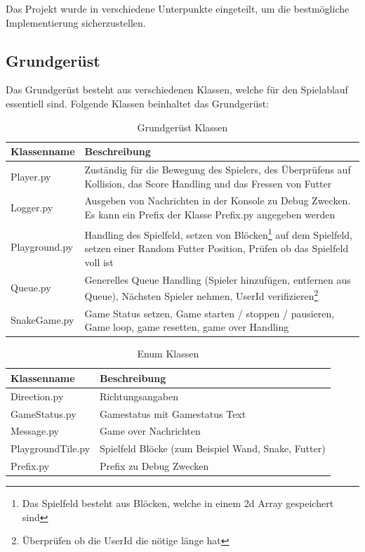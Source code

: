 \documentclass[a4paper,12pt]{scrartcl}
\begin{document}

Das Projekt wurde in verschiedene Unterpunkte eingeteilt, um die bestmögliche Implementierung sicherzustellen.


\subsection{Grundgerüst}
\label{grundgerüst}
Das Grundgerüst besteht aus verschiedenen Klassen, welche für den Spielablauf essentiell sind. Folgende Klassen beinhaltet das Grundgerüst:

\newpage

\begin{table}
\centering
\begin{tabular}[!htb]{p{4cm}|p{10cm}}
Klassenname & Beschreibung \\
\hline
Player.py & Zuständig für die Bewegung des Spielers, des Überprüfens auf Kollision, das Score Handling und das Fressen von Futter \\
Logger.py & Ausgeben von Nachrichten in der Konsole zu Debug Zwecken. Es kann ein Prefix der Klasse Prefix.py angegeben werden \\
Playground.py & Handling des Spielfeld, setzen von Blöcken\footnote{Das Spielfeld besteht aus Blöcken, welche in einem 2d Array gespeichert sind} auf dem Spielfeld, setzen einer Random Futter Position, Prüfen ob das Spielfeld voll ist \\
Queue.py & Generelles Queue Handling (Spieler hinzufügen, entfernen aus Queue), Nächsten Spieler nehmen, UserId verifizieren\footnote{Überprüfen ob die UserId die nötige länge hat} \\
SnakeGame.py & Game Status setzen, Game starten / stoppen / pausieren, Game loop, game resetten, game over Handling \\
\end{tabular}
\caption{Grundgerüst Klassen}
\end{table}

\begin{table}
\centering
\begin{tabular}[!htb]{p{4cm}|p{10cm}}
Klassenname & Beschreibung \\
\hline
Direction.py & Richtungsangaben \\
GameStatus.py & Gamestatus mit Gamestatus Text \\
Message.py & Game over Nachrichten \\
PlaygroundTile.py & Spielfeld Blöcke (zum Beispiel Wand, Snake, Futter) \\
Prefix.py & Prefix zu Debug Zwecken \\
\end{tabular}
\caption{Enum Klassen}
\end{table}
\end{document}
